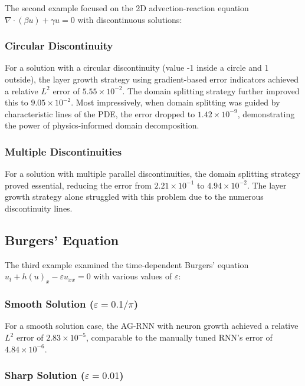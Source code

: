 \documentclass[11pt,a4paper]{article}
\begin{document}
The second example focused on the 2D advection-reaction equation $\nabla \cdot (\beta u) + \gamma u = 0$ with discontinuous solutions:

\subsubsection{Circular Discontinuity}

For a solution with a circular discontinuity (value -1 inside a circle and 1 outside), the layer growth strategy using gradient-based error indicators achieved a relative $L^2$ error of $5.55 \times 10^{-2}$. The domain splitting strategy further improved this to $9.05 \times 10^{-2}$. Most impressively, when domain splitting was guided by characteristic lines of the PDE, the error dropped to $1.42 \times 10^{-9}$, demonstrating the power of physics-informed domain decomposition.

\subsubsection{Multiple Discontinuities}

For a solution with multiple parallel discontinuities, the domain splitting strategy proved essential, reducing the error from $2.21 \times 10^{-1}$ to $4.94 \times 10^{-2}$. The layer growth strategy alone struggled with this problem due to the numerous discontinuity lines.

\subsection{Burgers' Equation}

The third example examined the time-dependent Burgers' equation $u_t + h(u)_x - \varepsilon u_{xx} = 0$ with various values of $\varepsilon$:

\subsubsection{Smooth Solution ($\varepsilon = 0.1/\pi$)}

For a smooth solution case, the AG-RNN with neuron growth achieved a relative $L^2$ error of $2.83 \times 10^{-5}$, comparable to the manually tuned RNN's error of $4.84 \times 10^{-6}$.

\subsubsection{Sharp Solution ($\varepsilon = 0.01$)}
\end{document}
